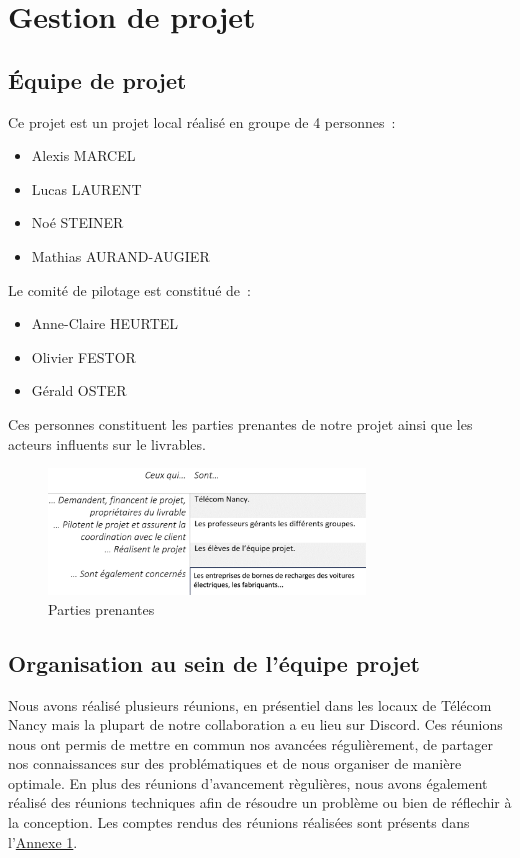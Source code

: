 \documentclass[french,a4paper]{article}
\begin{document}
\section{Gestion de projet}
\subsection{Équipe de projet}
Ce projet est un projet local réalisé en groupe de 4 personnes~:
\begin{itemize} 
    \item Alexis MARCEL
    \item Lucas LAURENT
    \item Noé STEINER
    \item Mathias AURAND-AUGIER
\end{itemize}
Le comité de pilotage est constitué de~:
\begin{itemize}
    \item Anne-Claire HEURTEL
    \item Olivier FESTOR
    \item Gérald OSTER
\end{itemize}
Ces personnes constituent les parties prenantes de notre projet ainsi que les acteurs influents sur le livrables.
\begin{figure}[H]
    \centering
    \includegraphics[width=0.75\textwidth]{img/parties_prenantes.png}
    \caption{Parties prenantes}
\end{figure}
\subsection{Organisation au sein de l’équipe projet}
Nous avons réalisé plusieurs réunions, en présentiel dans les locaux de Télécom Nancy mais la plupart de notre collaboration a eu lieu sur Discord. Ces réunions nous ont permis de mettre en commun nos avancées régulièrement, de partager nos connaissances sur des problématiques et de nous organiser de manière optimale.
En plus des réunions d'avancement règulières, nous avons également réalisé des réunions techniques afin de résoudre un problème ou bien de réflechir à la conception.
Les comptes rendus des réunions réalisées sont présents dans l’\hyperlink{annexe1}{Annexe 1}.
\end{document}
